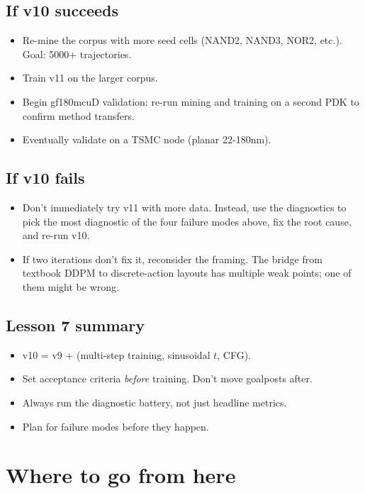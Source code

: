 \documentclass[11pt,a4paper]{article}
\begin{document}
\subsection{If v10 succeeds}

\begin{itemize}[leftmargin=*]
\item Re-mine the corpus with more seed cells (NAND2, NAND3, NOR2, etc.).
  Goal: 5000+ trajectories.
\item Train v11 on the larger corpus.
\item Begin gf180mcuD validation: re-run mining and training on a second
  PDK to confirm method transfers.
\item Eventually validate on a TSMC node (planar 22-180nm).
\end{itemize}

\subsection{If v10 fails}

\begin{itemize}[leftmargin=*]
\item Don't immediately try v11 with more data. Instead, use the
  diagnostics to pick the most diagnostic of the four failure modes
  above, fix the root cause, and re-run v10.
\item If two iterations don't fix it, reconsider the framing. The
  bridge from textbook DDPM to discrete-action layouts has multiple
  weak points; one of them might be wrong.
\end{itemize}

\subsection{Lesson 7 summary}

\begin{itemize}[leftmargin=*]
\item v10 = v9 + (multi-step training, sinusoidal $t$, CFG).
\item Set acceptance criteria \emph{before} training. Don't move
  goalposts after.
\item Always run the diagnostic battery, not just headline metrics.
\item Plan for failure modes before they happen.
\end{itemize}

\section*{Where to go from here}
\end{document}
